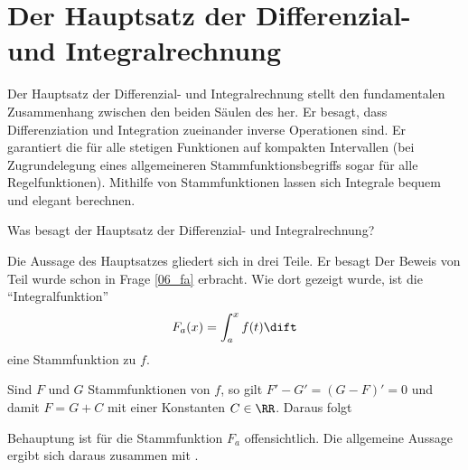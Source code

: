 \section{Der Hauptsatz der Differenzial- und Integralrechnung}\label{hauptsatz}

Der Hauptsatz der Differenzial- und Integralrechnung stellt den fundamentalen 
Zusammenhang zwischen den beiden Säulen des  
 her. 
Er besagt, dass Differenziation und Integration zueinander inverse Operationen 
sind. Er garantiert die 
 für alle stetigen Funktionen auf 
kompakten Intervallen (bei Zugrundelegung eines allgemeineren 
Stammfunktionsbegriffs sogar für alle Regelfunktionen). Mithilfe von 
Stammfunktionen lassen sich Integrale bequem und elegant berechnen. 


\begin{frage}\label{06_hpts}
Was besagt der Hauptsatz der Differenzial- und Integralrechnung?
\end{frage}

\begin{antwort}
Die Aussage des Hauptsatzes gliedert sich in drei Teile. Er besagt 
\noindent
Der Beweis von Teil  wurde schon in Frage \ref{06_fa} erbracht. 
Wie dort gezeigt wurde, ist die "`Integralfunktion"' 
\[
F_a (x) = \int_a^x f(t) \dift 
\]
eine Stammfunktion zu $f$. 

Sind $F$ und $G$ Stammfunktionen von $f$, so gilt 
$F'-G'=(G-F)'=0$ und damit $F=G+C$ mit einer Konstanten $C\in \RR$. 
Daraus folgt  

Behauptung  ist für die Stammfunktion $F_a$ offensichtlich. 
Die allgemeine Aussage ergibt sich daraus 
zusammen mit . 
\AntEnd
\end{antwort}

